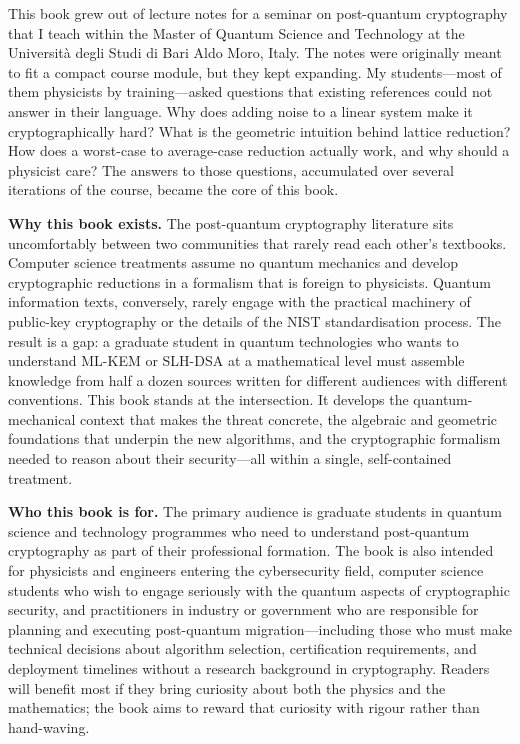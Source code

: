 \preface

This book grew out of lecture notes for a seminar on post-quantum cryptography that I teach within the Master of Quantum Science and Technology at the Universit\`{a} degli Studi di Bari Aldo Moro, Italy.  The notes were originally meant to fit a compact course module, but they kept expanding.  My students---most of them physicists by training---asked questions that existing references could not answer in their language.  Why does adding noise to a linear system make it cryptographically hard?  What is the geometric intuition behind lattice reduction?  How does a worst-case to average-case reduction actually work, and why should a physicist care?  The answers to those questions, accumulated over several iterations of the course, became the core of this book.

\medskip
\noindent\textbf{Why this book exists.}\enspace
The post-quantum cryptography literature sits uncomfortably between two communities that rarely read each other's textbooks.  Computer science treatments assume no quantum mechanics and develop cryptographic reductions in a formalism that is foreign to physicists.  Quantum information texts, conversely, rarely engage with the practical machinery of public-key cryptography or the details of the NIST standardisation process.  The result is a gap: a graduate student in quantum technologies who wants to understand ML-KEM or SLH-DSA at a mathematical level must assemble knowledge from half a dozen sources written for different audiences with different conventions.  This book stands at the intersection.  It develops the quantum-mechanical context that makes the threat concrete, the algebraic and geometric foundations that underpin the new algorithms, and the cryptographic formalism needed to reason about their security---all within a single, self-contained treatment.

\medskip
\noindent\textbf{Who this book is for.}\enspace
The primary audience is graduate students in quantum science and technology programmes who need to understand post-quantum cryptography as part of their professional formation.  The book is also intended for physicists and engineers entering the cybersecurity field, computer science students who wish to engage seriously with the quantum aspects of cryptographic security, and practitioners in industry or government who are responsible for planning and executing post-quantum migration---including those who must make technical decisions about algorithm selection, certification requirements, and deployment timelines without a research background in cryptography.  Readers will benefit most if they bring curiosity about both the physics and the mathematics; the book aims to reward that curiosity with rigour rather than hand-waving.

